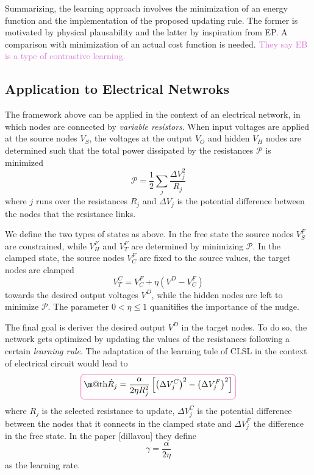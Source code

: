 \documentclass[11pt]{article}
\makeatletter
\newcommand*{\boxcolor}{RubineRed}
\renewcommand{\boxed}[1]{\textcolor{\boxcolor}{%
    \tikz[baseline={([yshift=-1ex]current bounding box.center)}] \node [rectangle, minimum width=1ex,rounded corners,draw] {\normalcolor\m@th$\displaystyle#1$};}}
\makeatother
\begin{document}
Summarizing, the learning approach involves the minimization of an energy function and the implementation of the proposed updating rule. The former is motivated by physical plausability and the latter by inspiration from EP. A comparison with minimization of an actual cost function is needed. \textcolor{Orchid}{They say EB is a type of contrastive learning.}

\subsection{Application to Electrical Netwroks}

The framework above can be applied in the context of an electrical network, in which nodes are connected by \textit{variable resistors}. When input voltages are applied at the source nodes $V_{S}$, the voltages at the output $V_{O}$ and hidden $V_{H}$ nodes are determined such that the total power dissipated by the resistances $\mathcal{P}$ is minimized
\[
\mathcal{P}  = \frac{1}{2} \sum_{j} \frac{\Delta V_j^2}{R_j}   
\]
where $j$ runs over the resistances $R_j$ and $\Delta V_j$ is the potential difference between the nodes that the resistance links.

We define the two types of states as above. In the free state the source nodes $V^{F}_{S}$ are constrained, while $V^{F}_{H}$ and $V^{F}_{T}$ are determined by minimizing $\mathcal{P}$. In the clamped state, the source nodes $V^{F}_{C}$ are fixed to the source values, the target nodes are clamped 
\[
V^{C}_{T} = V^{F}_{C} + \eta \left( V^{D} - V^{F}_{C} \right)   
\] 
towards the desired output voltages $V^D$, while the hidden nodes are left to minimize $\mathcal{P}$. The parameter $0 < \eta \le 1$ quanitifies the importance of the nudge.

The final goal is deriver the desired output $V^{D}$ in the target nodes. To do so, the network gets optimized by updating the values of the resistances following a certain \textit{learning rule}. The adaptation of the learning tule of CLSL in the context of electrical circuit would lead to 
\begin{equation}
\boxed{\dot{R}_j = \frac{\alpha}{2\eta R_{j}^2} \left[ \left( \Delta V_{j}^{C}\right)^2 - \left( \Delta V_{j}^{F}\right)^2 \right] }
\label{eq:cont_rul_res}   
\end{equation}
where $R_{j}$ is the selected resistance to update, $\Delta V_{j}^{C}$ is the potential difference between the nodes that it connects in the clamped state and $\Delta V_{j}^{F}$ the difference in the free state. In the paper [dillavou] they define
\[
\gamma = \frac{\alpha}{2\eta}
\]
as the learning rate.
\end{document}
